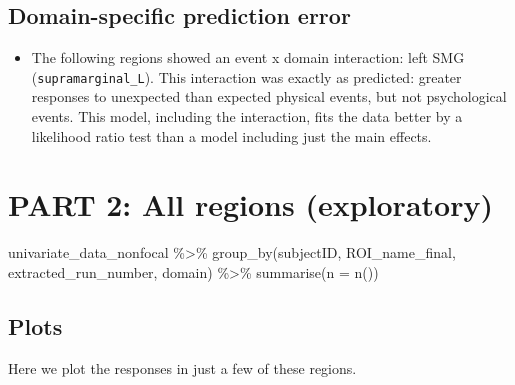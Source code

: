 \documentclass[
]{article}
\newenvironment{Shaded}{\begin{snugshade}}{\end{snugshade}}
\newcommand{\AttributeTok}[1]{\textcolor[rgb]{0.77,0.63,0.00}{#1}}
\newcommand{\FunctionTok}[1]{\textcolor[rgb]{0.00,0.00,0.00}{#1}}
\newcommand{\NormalTok}[1]{#1}
\newcommand{\SpecialCharTok}[1]{\textcolor[rgb]{0.00,0.00,0.00}{#1}}
\providecommand{\tightlist}{%
  \setlength{\itemsep}{0pt}\setlength{\parskip}{0pt}}
\begin{document}
\hypertarget{domain-specific-prediction-error}{%
\subsection{Domain-specific prediction
error}\label{domain-specific-prediction-error}}

\begin{itemize}
\tightlist
\item
  The following regions showed an event x domain interaction: left SMG
  (\texttt{supramarginal\_L}). This interaction was exactly as
  predicted: greater responses to unexpected than expected physical
  events, but not psychological events. This model, including the
  interaction, fits the data better by a likelihood ratio test than a
  model including just the main effects.
\end{itemize}

\hypertarget{part-2-all-regions-exploratory}{%
\section{PART 2: All regions
(exploratory)}\label{part-2-all-regions-exploratory}}

\begin{Shaded}
\begin{Highlighting}[]
\NormalTok{univariate\_data\_nonfocal }\SpecialCharTok{\%\textgreater{}\%}
  \FunctionTok{group\_by}\NormalTok{(subjectID, ROI\_name\_final, extracted\_run\_number, domain) }\SpecialCharTok{\%\textgreater{}\%}
  \FunctionTok{summarise}\NormalTok{(}\AttributeTok{n =} \FunctionTok{n}\NormalTok{())}
\end{Highlighting}
\end{Shaded}

\hypertarget{plots-1}{%
\subsection{Plots}\label{plots-1}}

Here we plot the responses in just a few of these regions.
\end{document}
